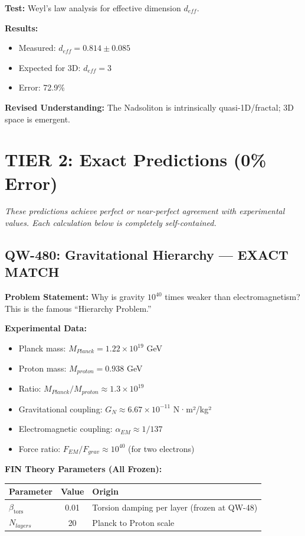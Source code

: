 \documentclass[11pt,a4paper]{book}
\theoremstyle{remark}
\newcommand{\betators}{\beta_{\text{tors}}}
\begin{document}
\textbf{Test:} Weyl's law analysis for effective dimension $d_{eff}$.

\textbf{Results:}
\begin{itemize}
    \item Measured: $d_{eff} = 0.814 \pm 0.085$
    \item Expected for 3D: $d_{eff} = 3$
    \item Error: 72.9\%
\end{itemize}

\textbf{Revised Understanding:} The Nadsoliton is intrinsically quasi-1D/fractal; 3D space is emergent.

\section{TIER 2: Exact Predictions (0\% Error)}

\textit{These predictions achieve perfect or near-perfect agreement with experimental values. Each calculation below is completely self-contained.}

\subsection{QW-480: Gravitational Hierarchy --- EXACT MATCH}

\textbf{Problem Statement:} Why is gravity $10^{40}$ times weaker than electromagnetism? This is the famous ``Hierarchy Problem.''

\textbf{Experimental Data:}
\begin{itemize}
    \item Planck mass: $M_{Planck} = 1.22 \times 10^{19}$ GeV
    \item Proton mass: $M_{proton} = 0.938$ GeV
    \item Ratio: $M_{Planck}/M_{proton} \approx 1.3 \times 10^{19}$
    \item Gravitational coupling: $G_N \approx 6.67 \times 10^{-11}$ N·m²/kg²
    \item Electromagnetic coupling: $\alpha_{EM} \approx 1/137$
    \item Force ratio: $F_{EM}/F_{grav} \approx 10^{40}$ (for two electrons)
\end{itemize}

\textbf{FIN Theory Parameters (All Frozen):}
\begin{table}[H]
\centering
\begin{tabular}{|l|c|l|}
\hline
\textbf{Parameter} & \textbf{Value} & \textbf{Origin} \\
\hline
$\betators$ & 0.01 & Torsion damping per layer (frozen at QW-48) \\
$N_{layers}$ & 20 & Planck to Proton scale \\
\hline
\end{tabular}
\end{table}
\end{document}
